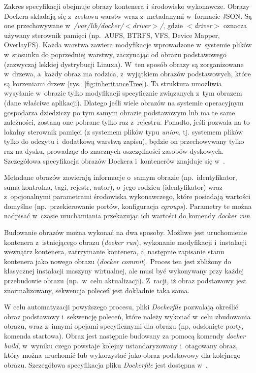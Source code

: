 Zakres specyfikacji obejmuje obrazy kontenera i~środowisko wykonawcze. Obrazy Dockera składają się z~zestawu warstw wraz z~metadanymi w~formacie JSON. Są one przechowywane w~\textit{/var/lib/docker/$<$driver$>$/}, gdzie \textit{$<$driver$>$} oznacza używany sterownik pamięci (np.~AUFS, BTRFS, VFS, Device Mapper, OverlayFS). Każda warstwa zawiera modyfikacje wprowadzone w~systemie plików w~stosunku do poprzedniej warstwy, zaczynając od obrazu podstawowego (zazwyczaj lekkiej dystrybucji Linuxa). W~ten sposób obrazy są zorganizowane w~drzewa, a~każdy obraz ma rodzica, z~wyjątkiem obrazów podstawowych, które są korzeniami drzew (rys.~\ref{fig:inheritanceTree}). Ta struktura umożliwia wysyłanie w~obrazie tylko modyfikacji specyficznie związanych z~tym obrazem (dane właściwe aplikacji). Dlatego jeśli wiele obrazów na systemie operacyjnym gospodarza dziedziczy po tym samym obrazie podstawowym lub ma te same zależności, zostaną one pobrane tylko raz z~rejestru. Ponadto, jeśli pozwala na to lokalny sterownik pamięci (z systemem plików typu \textit{union}, tj. systemem plików tylko do odczytu i~dodatkową warstwą zapisu), będzie on przechowywany tylko raz na dysku, prowadząc do znacznych oszczędności zasobów dyskowych. Szczegółowa specyfikacja obrazów Dockera i~kontenerów znajduje się w~\cite{MobyDockerImageSpecification}.

Metadane obrazów zawierają informacje o~samym obrazie (np.~identyfikator, suma kontrolna, tagi, rejestr, autor), o~jego rodzicu (identyfikator) wraz z~opcjonalnymi parametrami środowiska wykonawczego, które posiadają wartości domyślne (np.~przekierowanie portów, konfiguracja \textit{cgroups}). Parametry te można nadpisać w~czasie uruchamiania przekazując ich wartości do komendy \textit{docker run}.

Budowanie obrazów można wykonać na dwa sposoby. Możliwe jest uruchomienie kontenera z~istniejącego obrazu (\textit{docker run}), wykonanie modyfikacji i~instalacji wewnątrz kontenera, zatrzymanie kontenera, a~następnie zapisanie stanu kontenera jako nowego obrazu (\textit{docker commit}). Proces ten jest zbliżony do klasycznej instalacji maszyny wirtualnej, ale musi być wykonywany przy każdej przebudowie obrazu (np.~w~celu aktualizacji). Z~racji, iż obraz podstawowy jest znormalizowany, sekwencja poleceń jest dokładnie taka sama. 

W celu automatyzacji powyższego procesu, pliki \textit{Dockerfile} pozwalają określić obraz podstawowy i~sekwencję poleceń, które należy wykonać w~celu zbudowania obrazu, wraz z~innymi opcjami specyficznymi dla obrazu (np, odsłonięte porty, komenda startowa). Obraz jest następnie budowany za pomocą komendy \textit{docker build}, w~wyniku czego powstaje kolejny ustandaryzowany i~otagowany obraz, który można uruchomić lub wykorzystać jako obraz podstawowy dla kolejnego obrazu. Szczegółowa specyfikacja pliku \textit{Dockerfile} jest dostępna w~\cite{DockerDockerfileReference}.

